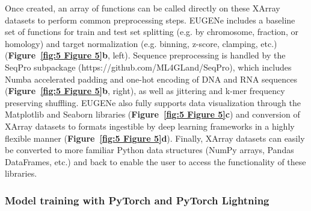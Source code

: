 Once created, an array of functions can be called directly on these XArray datasets to perform common preprocessing steps. EUGENe includes a baseline set of functions for train and test set splitting (e.g. by chromosome, fraction, or homology\cite{Teufel2023-kn}) and target normalization (e.g. binning, z-score, clamping, etc.) (\textbf{Figure~\ref{fig:5 Figure 5}\textbf{b}}, left). Sequence preprocessing is handled by the SeqPro subpackage (https://github.com/ML4GLand/SeqPro), which includes Numba accelerated\cite{Lam2015-mo} padding and one-hot encoding of DNA and RNA sequences (\textbf{Figure~\ref{fig:5 Figure 5}\textbf{b}}, right), as well as jittering and k-mer frequency preserving shuffling\cite{Jiang2008-li}. EUGENe also fully supports data visualization through the Matplotlib\cite{Hunter2007-es} and Seaborn\cite{Waskom2021-lk} libraries (\textbf{Figure~\ref{fig:5 Figure 5}\textbf{c}}) and conversion of XArray datasets to formats ingestible by deep learning frameworks in a highly flexible manner (\textbf{Figure~\ref{fig:5 Figure 5}\textbf{d}}). Finally, XArray datasets can easily be converted to more familiar Python data structures (NumPy arrays, Pandas DataFrames, etc.) and back to enable the user to access the functionality of these libraries.

\subsubsection{Model training with PyTorch and PyTorch Lightning}

